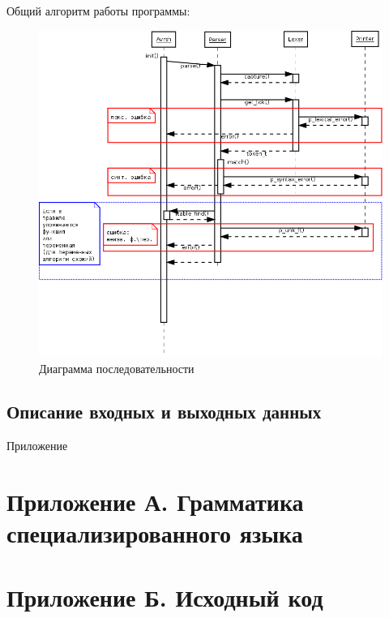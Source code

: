 \documentclass[a4paper, 12pt]{article}
\begin{document}
Общий алгоритм работы программы:
\begin{figure}[H]
	\centering
	\includegraphics[width=\textwidth]{diag/sequence.png}
	\caption{Диаграмма последовательности}
\end{figure}



\subsection{Описание входных и выходных данных} %


\appendix
\newpage
{}
{\huge Приложение}
\section{Приложение А. Грамматика специализированного языка}
\label{app:grammar}


\section*{Приложение Б. Исходный код}
\end{document}
